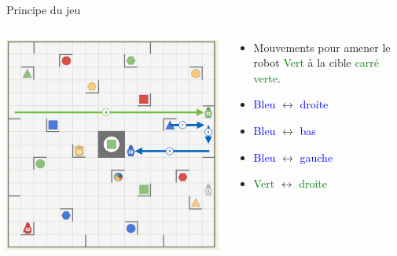 \documentclass{beamer}
\begin{document}
\begin{frame}{Principe du jeu}
    \begin{columns}
        \begin{column}{0.6\textwidth}
        \vspace{\topsep}
        \includegraphics[scale=0.4]{Images/r6.png}%
        \end{column}
        
        \begin{column}{0.4\textwidth}
        \begin{itemize}
        \item Mouvements pour amener le robot \textcolor{green}{Vert} à la cible \textcolor{green}{carré verte}.
        \item \textcolor{blue}{Bleu} $\longleftrightarrow$ \textcolor{blue}{droite}
        \item \textcolor{blue}{Bleu} $\longleftrightarrow$ \textcolor{blue}{bas}
        \item \textcolor{blue}{Bleu} $\longleftrightarrow$ \textcolor{blue}{gauche}
        \item \textcolor{green}{Vert} $\longleftrightarrow$ \textcolor{green}{droite}
        \end{itemize}
        \end{column}
    \end{columns}
\end{frame}
\end{document}
